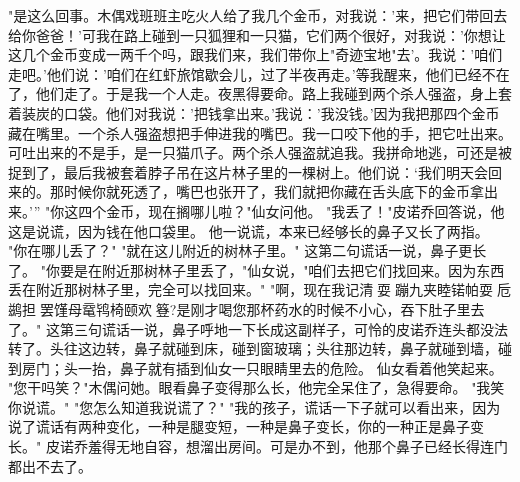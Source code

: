\documentclass[12pt,UTF8]{ctexbook}
\begin{document}
"是这么回事。木偶戏班班主吃火人给了我几个金币，对我说：'来，把它们带回去给你爸爸！'可我在路上碰到一只狐狸和一只猫，它们两个很好，对我说：'你想让这几个金币变成一两千个吗，跟我们来，我们带你上"奇迹宝地"去'。我说：'咱们走吧。'他们说：'咱们在红虾旅馆歇会儿，过了半夜再走。'等我醒来，他们已经不在了，他们走了。于是我一个人走。夜黑得要命。路上我碰到两个杀人强盗，身上套着装炭的口袋。他们对我说：'把钱拿出来。'我说：'我没钱。'因为我把那四个金币藏在嘴里。一个杀人强盗想把手伸进我的嘴巴。我一口咬下他的手，把它吐出来。可吐出来的不是手，是一只猫爪子。两个杀人强盗就追我。我拼命地逃，可还是被捉到了，最后我被套着脖子吊在这片林子里的一棵树上。他们说：‘我们明天会回来的。那时候你就死透了，嘴巴也张开了，我们就把你藏在舌头底下的金币拿出来。’”
"你这四个金币，现在搁哪儿啦？"仙女问他。
"我丢了！"皮诺乔回答说，他这是说谎，因为钱在他口袋里。
他一说谎，本来已经够长的鼻子又长了两指。
"你在哪儿丢了？"
"就在这儿附近的树林子里。"
这第二句谎话一说，鼻子更长了。
"你要是在附近那树林子里丢了，"仙女说，"咱们去把它们找回来。因为东西丢在附近那树林子里，完全可以找回来。"
"啊，现在我记清耍蹦九夹睦锘帕耍卮鹚担罢馑母鼋鸨椅颐欢簦?是刚才喝您那杯药水的时候不小心，吞下肚子里去了。"
这第三句谎话一说，鼻子呼地一下长成这副样子，可怜的皮诺乔连头都没法转了。头往这边转，鼻子就碰到床，碰到窗玻璃；头往那边转，鼻子就碰到墙，碰到房门；头一抬，鼻子就有插到仙女一只眼睛里去的危险。
仙女看着他笑起来。
"您干吗笑？"木偶问她。眼看鼻子变得那么长，他完全呆住了，急得要命。
"我笑你说谎。"
"您怎么知道我说谎了？"
"我的孩子，谎话一下子就可以看出来，因为说了谎话有两种变化，一种是腿变短，一种是鼻子变长，你的一种正是鼻子变长。"
皮诺乔羞得无地自容，想溜出房间。可是办不到，他那个鼻子已经长得连门都出不去了。

\chapter{}
\end{document}
